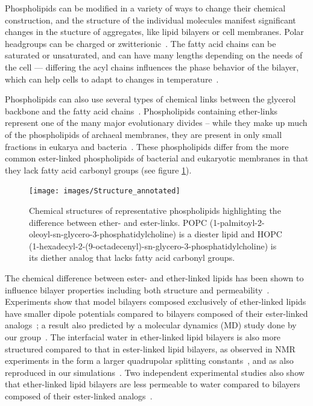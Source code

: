 \documentclass[12pt,openany,final]{book}
\begin{document}
Phospholipids can be modified in a variety of ways to change their chemical construction,
and the structure of the individual molecules manifest significant changes
in the stucture of aggregates, like lipid bilayers or cell membranes.
Polar headgroups can be charged or zwitterionic~\cite{israelachvili:2011:intermol}. The fatty acid chains can be saturated or unsaturated, 
and can have many lengths depending 
on the needs of the cell --- differing the acyl chains influences the 
phase behavior of the bilayer, which can help cells to adapt to changes in
temperature~\cite{ashrafuzzaman:2012:membrane,zhang:2008:memhomeo}.

Phospholipids can also use several types of chemical links between the glycerol
backbone and the fatty acid chains~\cite{sehgal:1962, koga:2014}.
Phospholipids containing ether-links represent one of the many major evolutionary divides -- 
while they make up much of the phospholipids of archaeal membranes,
 they are present in only small fractions in eukarya and bacteria~\cite{sehgal:1962, koga:2014, kates:1993:archealipids}. 
These phospholipids differ from the more common ester-linked phospholipids of bacterial and 
eukaryotic membranes in that they lack fatty acid carbonyl groups (see figure \ref{fig:struc}). 

\begin{figure}[htp]
\caption[Chemical structures of representative phospholipids highlighting the difference
between ether- and ester-links.]{ 
Chemical structures of representative phospholipids highlighting the difference 
between ether- and ester-links. POPC (1-palmitoyl-2-oleoyl-sn-glycero-3-phosphatidylcholine) is a 
diester lipid and HOPC (1-hexadecyl-2-(9-octadecenyl)-sn-glycero-3-phosphatidylcholine) is its diether analog that lacks fatty acid carbonyl groups.
}
\label{fig:struc}
\texttt{[image: images/Structure\_annotated]}
\end{figure}

The chemical difference between ester- and ether-linked lipids has been shown to influence 
bilayer properties including both structure and permeability~\cite{guler:2009,jansen:1995, gawrisch:1992,haas:1990,fogarty:2015,kruczek:2017:ether}. 
Experiments show that model bilayers composed exclusively of ether-linked lipids have smaller dipole potentials compared to 
bilayers composed of their ester-linked analogs~\cite{gawrisch:1992}; a result also predicted by a molecular dynamics (MD) 
study done by our group~\cite{kruczek:2017:ether}. The interfacial water in ether-linked lipid bilayers is also more structured compared to that 
in ester-linked lipid bilayers, as observed in NMR experiments in the form a larger quadrupolar splitting constants~\cite{gawrisch:1992}, and as 
also reproduced in our simulations~\cite{kruczek:2017:ether}. Two independent experimental studies also show 
that ether-linked lipid bilayers are less permeable to water compared to bilayers composed of their ester-linked 
analogs~\cite{jansen:1995, guler:2009}. 
\end{document}
